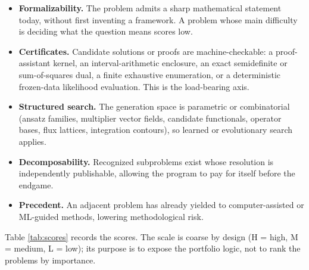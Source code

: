 \documentclass[11pt,letterpaper]{article}
\newcommand{\HH}{H}
\newcommand{\MM}{M}
\newcommand{\LL}{L}
\begin{document}
\begin{itemize}[leftmargin=1.6em,itemsep=1pt,topsep=2pt]
\item[\textbf{C1.}] \textbf{Formalizability.} The problem admits a sharp mathematical statement today, without first inventing a framework. A problem whose main difficulty is deciding what the question means scores low.
\item[\textbf{C2.}] \textbf{Certificates.} Candidate solutions or proofs are machine-checkable: a proof-assistant kernel, an interval-arithmetic enclosure, an exact semidefinite or sum-of-squares dual, a finite exhaustive enumeration, or a deterministic frozen-data likelihood evaluation. This is the load-bearing axis.
\item[\textbf{C3.}] \textbf{Structured search.} The generation space is parametric or combinatorial (ansatz families, multiplier vector fields, candidate functionals, operator bases, flux lattices, integration contours), so learned or evolutionary search applies.
\item[\textbf{C4.}] \textbf{Decomposability.} Recognized subproblems exist whose resolution is independently publishable, allowing the program to pay for itself before the endgame.
\item[\textbf{C5.}] \textbf{Precedent.} An adjacent problem has already yielded to computer-assisted or ML-guided methods, lowering methodological risk.
\end{itemize}

Table \ref{tab:scores} records the scores. The scale is coarse by design (\HH{} = high, \MM{} = medium, \LL{} = low); its purpose is to expose the portfolio logic, not to rank the problems by importance.
\end{document}
